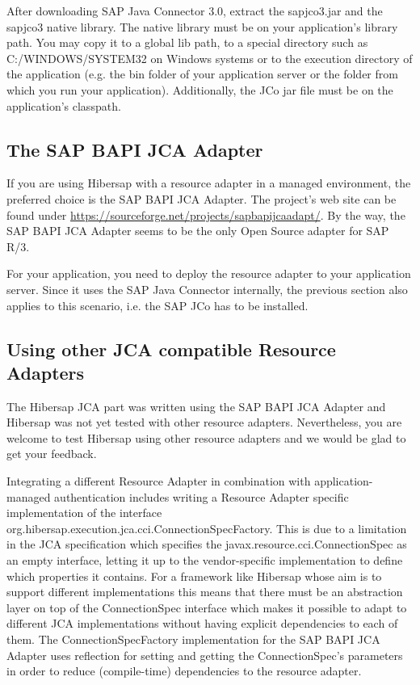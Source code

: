 After downloading SAP Java Connector 3.0, extract the sapjco3.jar and the sapjco3 native library. The native library must be on your application's library path. You may copy it to a global lib path, to a special directory such as C:/WINDOWS/SYSTEM32 on Windows systems or to the execution directory of the application (e.g. the bin folder of your application server or the folder from which you run your application). Additionally, the JCo jar file must be on the application's classpath. 

\subsection{The SAP BAPI JCA Adapter}
If you are using Hibersap with a resource adapter in a managed environment, the preferred choice is the SAP BAPI JCA Adapter. The project's web site can be found under \url{https://sourceforge.net/projects/sapbapijcaadapt/}. By the way, the SAP BAPI JCA Adapter seems to be the only Open Source adapter for SAP R/3.

For your application, you need to deploy the resource adapter to your application server. Since it uses the SAP Java Connector internally, the previous section also applies to this scenario, i.e. the SAP JCo has to be installed. 

\subsection{Using other JCA compatible Resource Adapters}
The Hibersap JCA part was written using the SAP BAPI JCA Adapter and Hibersap was not yet tested with other resource adapters. Nevertheless, you are welcome to test Hibersap using other resource adapters and we would be glad to get your feedback. 

Integrating a different Resource Adapter in combination with application-managed authentication includes writing a Resource Adapter specific implementation of the interface org.hibersap.\-execution.jca.cci.ConnectionSpecFactory. This is due to a limitation in the JCA specification which specifies the javax.resource.cci.ConnectionSpec as an empty interface, letting it up to the vendor-specific implementation to define which properties it contains. For a framework like Hibersap whose aim is to support different implementations this means that there must be an abstraction layer on top of the ConnectionSpec interface which makes it possible to adapt to different JCA implementations without having explicit dependencies to each of them. The ConnectionSpecFactory implementation for the SAP BAPI JCA Adapter uses reflection for setting and getting the ConnectionSpec's parameters in order to reduce (compile-time) dependencies to the resource adapter.

